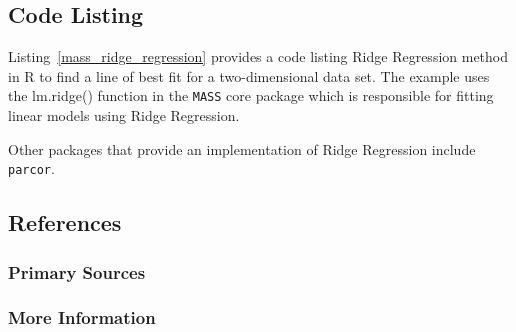 \subsection{Code Listing}
Listing~\ref{mass_ridge_regression} provides a code listing Ridge Regression method in R to find a line of best fit for a two-dimensional data set.
The example uses the {lm.ridge()} function in the \texttt{MASS} core package which is responsible for fitting linear models using Ridge Regression.





Other packages that provide an implementation of Ridge Regression include \texttt{parcor}.


\subsection{References}

\subsubsection{Primary Sources}


\subsubsection{More Information}



